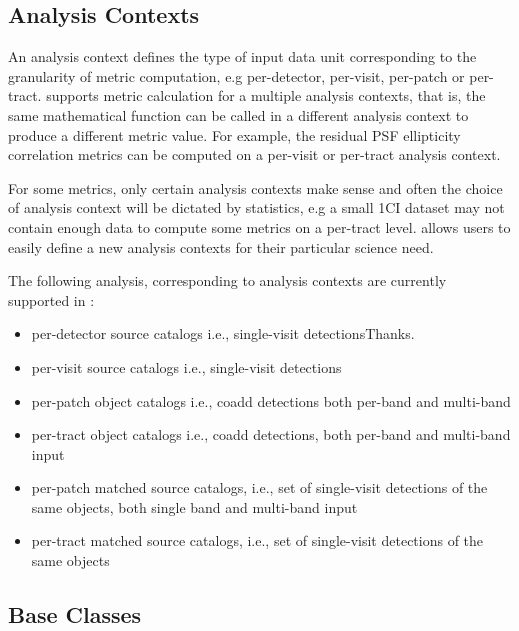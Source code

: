 \subsection{Analysis Contexts} \label{ssec:contexts}


An analysis context defines the type of input data unit corresponding to the granularity of metric computation, e.g per-detector, per-visit, per-patch or per-tract.
\faro supports metric calculation for a multiple analysis contexts, that is, the same mathematical function can be called in a different analysis context to produce a different metric value. 
For example, the residual PSF ellipticity correlation metrics can be computed on a per-visit or per-tract analysis context. 

For some metrics, only certain analysis contexts make sense and often the choice of analysis context will be dictated by statistics, e.g a small 1\degsq CI dataset may not contain enough data to compute some metrics on a per-tract level. 
\faro allows users to easily define a new analysis contexts for their particular science need. 

The following analysis, corresponding to analysis contexts  are currently supported in \faro:
\begin{itemize}
\item per-detector source catalogs i.e., single-visit detectionsThanks.
\item per-visit source catalogs i.e., single-visit detections
\item per-patch object catalogs i.e., coadd detections both per-band and multi-band
\item per-tract object catalogs i.e., coadd detections, both per-band and multi-band input
\item per-patch matched source catalogs, i.e., set of single-visit detections of the same objects, both single band and multi-band input
\item per-tract matched source catalogs, i.e., set of single-visit detections of the same objects 
\end{itemize}

\subsection{Base Classes} \label{ssec:base_classes}

